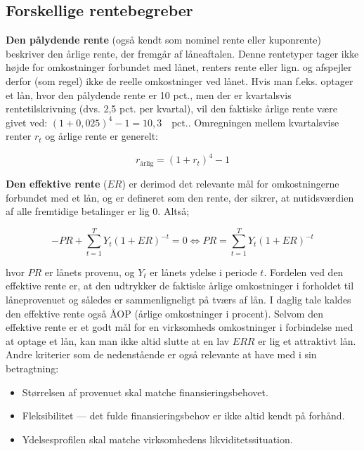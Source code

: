 \documentclass[10pt,reqno, usenames]{article}
\begin{document}
\subsection{Forskellige rentebegreber}
\textbf{Den pålydende rente} (også kendt som nominel rente eller kuponrente) beskriver den årlige rente, der fremgår af låneaftalen. Denne rentetyper tager ikke højde for omkostninger forbundet med lånet, renters rente eller lign. og afspejler derfor (som regel) ikke de reelle omkostninger ved lånet. Hvis man f.eks. optager et lån, hvor den pålydende rente er 10 pct., men der er kvartalsvis rentetilskrivning (dvs. 2,5 pct. per kvartal), vil den faktiske årlige rente være givet ved: $(1+0,025)^4-1=10,3 \quad \text{pct.}$. Omregningen mellem kvartalsvise renter $r_t$ og årlige rente er generelt: 

\begin{equation}
    r_{\text{årlig}} = (1+r_t)^4 - 1
\end{equation}

\vspace{10 pt}

\textbf{Den effektive rente} ($ER$) er derimod det relevante mål for omkostningerne forbundet med et lån, og er defineret som den rente, der sikrer, at nutidsværdien af alle fremtidige betalinger er lig 0. Altså;  

\begin{equation}
    -PR + \sum_{t=1}^{T} Y_t (1 + ER)^{-t} = 0 \iff PR = \sum_{t=1}^{T} Y_t (1 + ER)^{-t}
\end{equation}

hvor $PR$ er lånets provenu, og $Y_t$ er lånets ydelse i periode $t$. Fordelen ved den effektive rente er, at den udtrykker de faktiske årlige omkostninger i forholdet til låneprovenuet og således er sammenligneligt på tværs af lån. I daglig tale kaldes den effektive rente også ÅOP (årlige omkostninger i procent). Selvom den effektive rente er et godt mål for en virksomheds omkostninger i forbindelse med at optage et lån, kan man ikke altid slutte at en lav $ERR$ er lig et attraktivt lån. Andre kriterier som de nedenstående er også relevante at have med i sin betragtning: 

\begin{itemize}
    \item Størrelsen af provenuet skal matche finansieringsbehovet. 
    \item Fleksibilitet — det fulde finansieringsbehov er ikke altid kendt på forhånd. 
    \item Ydelsesprofilen skal matche virksomhedens likviditetssituation. 
\end{itemize}
\end{document}
